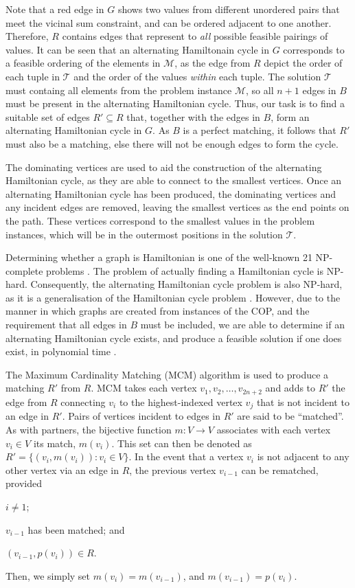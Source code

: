 \documentclass{elsarticle}
\begin{document}
Note that a red edge in $G$ shows two values from different unordered pairs that meet the vicinal sum constraint, and can be ordered adjacent to one another. Therefore, $R$ contains edges that represent to \emph{all} possible feasible pairings of values. It can be seen that an alternating Hamiltonain cycle in $G$ corresponds to a feasible ordering of the elements in $\mathcal{M}$, as the edge from $R$ depict the order of each tuple in $\mathcal{T}$ and the order of the values \emph{within} each tuple. The solution $\mathcal{T}$ must containg all elements from the problem instance $\mathcal{M}$, so all $n+1$ edges in $B$ must be present in the alternating Hamiltonian cycle. Thus, our task is to find a suitable set of edges $R' \subseteq R$ that, together with the edges in $B$, form an alternating Hamiltonian cycle in $G$. As $B$ is a perfect matching, it follows that $R'$ must also be a matching, else there will not be enough edges to form the cycle.

The dominating vertices are used to aid the construction of the alternating Hamiltonian cycle, as they are able to connect to the smallest vertices. Once an alternating Hamiltonian cycle has been produced, the dominating vertices and any incident edges are removed, leaving the smallest vertices as the end points on the path. These vertices correspond to the smallest values in the problem instances, which will be in the outermost positions in the solution $\mathcal{T}$.

Determining whether a graph is Hamiltonian is one of the well-known 21 NP-complete problems \cite{karp1972}. The problem of actually finding a Hamiltonian cycle is NP-hard. Consequently, the alternating Hamiltonian cycle problem is also NP-hard, as it is a generalisation of the Hamiltonian cycle problem \cite{haggkvist1977}. However, due to the manner in which graphs are created from instances of the COP, and the requirement that all edges in $B$ must be included, we are able to determine if an alternating Hamiltonian cycle exists, and produce a feasible solution if one does exist, in polynomial time \cite{hawa2018}.

The Maximum Cardinality Matching (MCM) algorithm is used to produce a matching $R'$ from $R$. MCM takes each vertex $v_1, v_2,\dotsc,v_{2n+2}$ and adds to $R'$ the edge from $R$ connecting $v_i$ to the highest-indexed vertex $v_j$ that is not incident to an edge in $R'$. Pairs of vertices incident to edges in $R'$ are said to be ``matched''. As with partners, the bijective function $m : V \to V$ associates with each vertex $v_i \in V$ its match, $m(v_i)$. This set can then be denoted as $R' = \{(v_i, m(v_i)): v_i \in V\}$. In the event that a vertex $v_i$ is not adjacent to any other vertex via an edge in $R$, the previous vertex $v_{i-1}$ can be rematched, provided 
\begin{enumerate*}[label={(\alph*)}]
	\item $i \neq 1$;
	\item $v_{i-1}$ has been matched; and
	\item $(v_{i-1}, p(v_i)) \in R$.
\end{enumerate*} 
Then, we simply set $m(v_i) = m(v_{i-1})$, and $m(v_{i-1}) = p(v_i)$.
\end{document}
